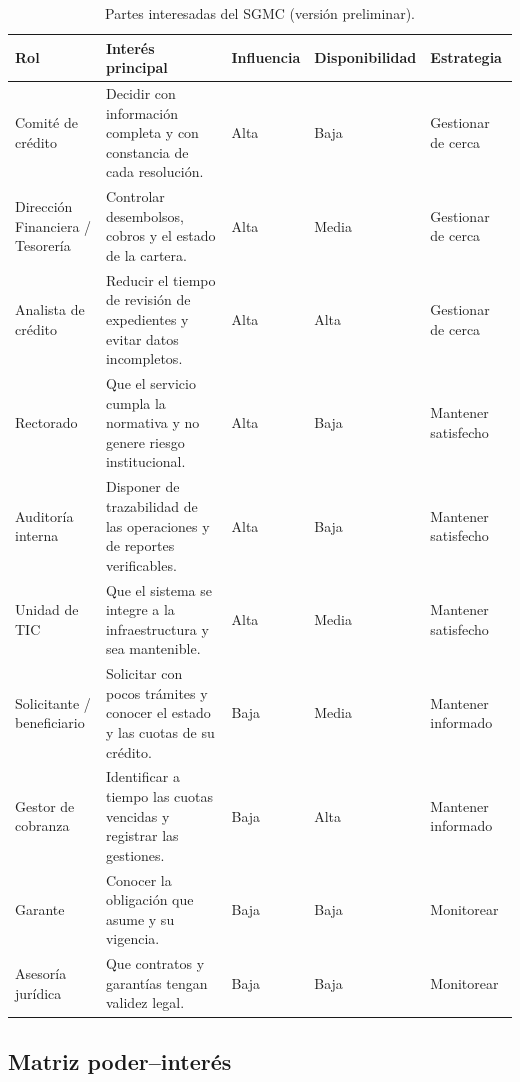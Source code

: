 \begin{table}[htbp]
\centering
\caption{Partes interesadas del SGMC (versión preliminar).}
\label{tab:partes-interesadas}
\small
\begin{tabularx}{\textwidth}{@{}>{\raggedright\arraybackslash}p{2.6cm}>{\raggedright\arraybackslash}X>{\raggedright\arraybackslash}p{1.2cm}>{\raggedright\arraybackslash}p{1.5cm}>{\raggedright\arraybackslash}p{2.4cm}@{}}
\toprule
\textbf{Rol} & \textbf{Interés principal} & \textbf{Influ\-encia} & \textbf{Disponi\-bilidad} & \textbf{Estrategia} \\
\midrule
Comité de crédito & Decidir con información completa y con constancia de cada resolución. & Alta & Baja & Gestionar de cerca \\
Dirección Financiera / Tesorería & Controlar desembolsos, cobros y el estado de la cartera. & Alta & Media & Gestionar de cerca \\
Analista de crédito & Reducir el tiempo de revisión de expedientes y evitar datos incompletos. & Alta & Alta & Gestionar de cerca \\
Rectorado & Que el servicio cumpla la normativa y no genere riesgo institucional. & Alta & Baja & Mantener satisfecho \\
Auditoría interna & Disponer de trazabilidad de las operaciones y de reportes verificables. & Alta & Baja & Mantener satisfecho \\
Unidad de TIC & Que el sistema se integre a la infraestructura y sea mantenible. & Alta & Media & Mantener satisfecho \\
Solicitante / beneficiario & Solicitar con pocos trámites y conocer el estado y las cuotas de su crédito. & Baja & Media & Mantener informado \\
Gestor de cobranza & Identificar a tiempo las cuotas vencidas y registrar las gestiones. & Baja & Alta & Mantener informado \\
Garante & Conocer la obligación que asume y su vigencia. & Baja & Baja & Monitorear \\
Asesoría jurídica & Que contratos y garantías tengan validez legal. & Baja & Baja & Monitorear \\
\bottomrule
\end{tabularx}
\end{table}

\subsection{Matriz poder--interés}

